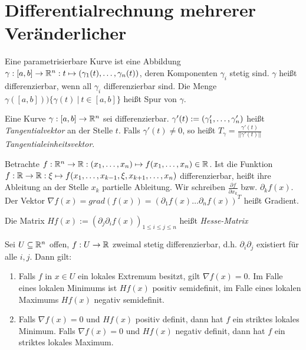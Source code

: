 \pagebreak

\section{Differentialrechnung mehrerer Veränderlicher}

\begin{definition}
	Eine parametrisierbare Kurve ist eine Abbildung $\gamma : [a, b] \rightarrow \mathbb{R}^n : t \mapsto (\gamma_1(t), \dots, \gamma_n(t))$, deren Komponenten $\gamma_i$ stetig sind. $\gamma$ heißt differenzierbar, wenn all $\gamma_i$ differenzierbar sind. Die Menge $\gamma([a,b]) ) \{\gamma(t) \medspace | \medspace t \in [a,b] \}$ heißt Spur von $\gamma$.
\end{definition}

\begin{definition}[Tangentialvektor]
	Eine Kurve $\gamma : [a,b] \rightarrow \mathbb{R}^n$ sei differenzierbar. $\gamma'(t) := (\gamma'_1, \dots, \gamma'_n)$ heißt \emph{Tangentialvektor} an der Stelle $t$. Falls $\gamma'(t) \neq 0$, so heißt $T_\gamma = \frac{\gamma'(t)}{||\gamma'(t)||}$ \emph{Tangentialeinheitsvektor}.
\end{definition}

\begin{definition}
	Betrachte $f : \mathbb{R}^n \rightarrow \mathbb{R} : (x_1, \dots, x_n) \mapsto f(x_1, \dots, x_n) \in \mathbb{R}$. Ist die Funktion $f : \mathbb{R} \rightarrow \mathbb{R} : \xi \mapsto f(x_1, \dots, x_{k-1}, \xi, x_{k+1}, \dots, x_n)$ differenzierbar, heißt ihre Ableitung an der Stelle $x_k$ partielle Ableitung. Wir schreiben $\frac{\partial f}{\partial x_k}$ bzw. $\partial_k f(x)$. Der Vektor $\nabla f(x) = grad(f(x)) = (\partial_1 f(x) \dots \partial_n f(x))^T$ heißt Gradient.
\end{definition}

\begin{definition}
	Die Matrix $Hf(x) := (\partial_j \partial_i f(x))_{1 \leq i \leq j \leq n}$ heißt \emph{Hesse-Matrix}
\end{definition}

\begin{satz}
	Sei $U \subseteq \mathbb{R}^n$ offen, $f : U \rightarrow \mathbb{R}$ zweimal stetig differenzierbar, d.h. $\partial_i \partial_j$ existiert für alle $i, j$. Dann gilt:
	\begin{enumerate}[noitemsep]
		\item Falls $f$ in $x \in U$ ein lokales Extremum besitzt, gilt $\nabla f(x) = 0$. Im Falle eines lokalen Minimums ist $Hf(x)$ positiv semidefinit, im Falle eines lokalen Maximums $Hf(x)$ negativ semidefinit.
		\item Falls $\nabla f(x) = 0$ und $Hf(x)$ positiv definit, dann hat $f$ ein striktes lokales Minimum. Falls $\nabla f(x) = 0$ und $Hf(x)$ negativ definit, dann hat $f$ ein striktes lokales Maximum. 
	\end{enumerate}
\end{satz}

